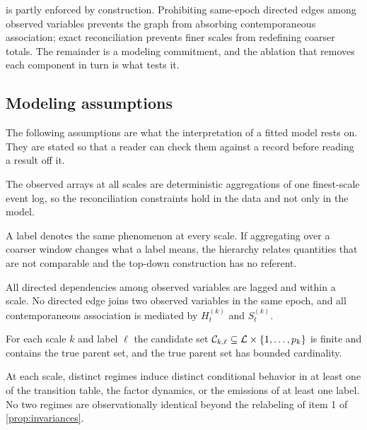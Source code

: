  is partly enforced by construction. Prohibiting
same-epoch directed edges among observed variables prevents the graph from
absorbing contemporaneous association; exact reconciliation prevents finer
scales from redefining coarser totals. The remainder is a modeling commitment,
and the ablation that removes each component in turn is what tests it.

\subsection{Modeling assumptions}
\label{sec:assumptions}

The following assumptions are what the interpretation of a fitted model rests
on. They are stated so that a reader can check them against a record before
reading a result off it.

\begin{assumption}
\label{assm:aggregation}
The observed arrays at all scales are deterministic aggregations of one
finest-scale event log, so the reconciliation constraints hold in the data and
not only in the model.
\end{assumption}

\begin{assumption}
\label{assm:label_semantics}
A label denotes the same phenomenon at every scale. If aggregating over a
coarser window changes what a label means, the hierarchy relates quantities
that are not comparable and the top-down construction has no referent.
\end{assumption}

\begin{assumption}
\label{assm:lag_structure}
All directed dependencies among observed variables are lagged and within a
scale. No directed edge joins two observed variables in the same epoch, and all
contemporaneous association is mediated by $H_t^{(k)}$ and $S_t^{(k)}$.
\end{assumption}

\begin{assumption}
\label{assm:candidates}
For each scale $k$ and label $\ell$ the candidate set
${\mathcal{C}}_{k,\ell} \subseteq {\mathcal{L}} \times \{1,\dots,p_k\}$ is finite and contains the
true parent set, and the true parent set has bounded cardinality.
\end{assumption}

\begin{assumption}
\label{assm:distinct_regimes}
At each scale, distinct regimes induce distinct conditional behavior in at
least one of the transition table, the factor dynamics, or the emissions of at
least one label. No two regimes are observationally identical beyond the
relabeling of item 1 of \cref{prop:invariances}.
\end{assumption}

